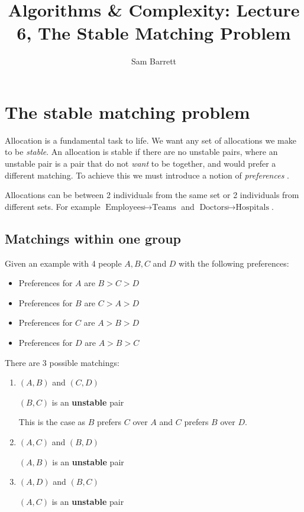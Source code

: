 \documentclass{article}
\title{Algorithms \& Complexity: Lecture 6, The Stable Matching Problem}
\author{Sam Barrett}
\begin{document}
\maketitle

\section{The stable matching problem}

Allocation is a fundamental task to life. We want any set of allocations we make to be \textit{stable}. An allocation is stable if there are no unstable pairs, where an unstable pair is a pair that do not \textit{want} to be together, and would prefer a different matching. To achieve this we must introduce a notion of \textit{preferences} .

Allocations can be between 2 individuals from the same set or 2 individuals from different sets. For example $\text{Employees} \mapsto \text{Teams}$ and $\text{Doctors} \mapsto \text{Hospitals}$.

\subsection{Matchings within one group}

Given an example with 4 people $A,B,C$ and $D$ with the following preferences:

\begin{itemize}
  \item Preferences for $A$ are $B > C > D$
  \item Preferences for $B$ are $C > A> D $
  \item Preferences for $C$ are $A > B >D$
  \item Preferences for $D$ are $A>B>C$
\end{itemize}

There are 3 possible matchings:

\begin{enumerate}
  \item $(A,B)$ and $(C,D)$

  $(B,C)$ is an \textbf{unstable} pair

  This is the case as $B$ prefers $C$ over $A$ and $C$ prefers $B$ over $D$.
  \item $(A,C)$ and $(B,D)$

  $(A,B)$ is an \textbf{unstable} pair
  \item $(A,D)$ and $(B,C)$

  $(A,C)$ is an \textbf{unstable} pair
\end{enumerate}
\end{document}
